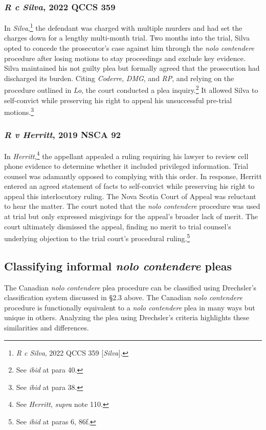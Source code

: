 \subsubsection{\textit{R c Silva}, 2022 QCCS 359}

In \textit{Silva},\footnote{\textit{R c Silva}, 2022 QCCS 359 [\textit{Silva}].} the defendant was charged with multiple murders and had set the charges down for a lengthy multi-month trial. Two months into the trial, Silva opted to concede the prosecutor's case against him through the \textit{nolo contendere} procedure after losing motions to stay proceedings and exclude key evidence. Silva maintained his not guilty plea but formally agreed that the prosecution had discharged its burden. Citing \textit{Coderre}, \textit{DMG}, and \textit{RP}, and relying on the procedure outlined in \textit{Lo}, the court conducted a plea inquiry.\footnote{See \textit{ibid} at para 40.} It allowed Silva to self-convict while preserving his right to appeal his unsuccessful pre-trial motions.\footnote{See \textit{ibid} at para 38.}

\subsubsection{\textit{R v Herritt}, 2019 NSCA 92}

In \textit{Herritt},\footnote{See \textit{Herritt}, \textit{supra} note 110.} the appellant appealed a ruling requiring his lawyer to review cell phone evidence to determine whether it included privileged information. Trial counsel was adamantly opposed to complying with this order. In response, Herritt entered an agreed statement of facts to self-convict while preserving his right to appeal this interlocutory ruling. The Nova Scotia Court of Appeal was reluctant to hear the matter. The court noted that the \textit{nolo contendere} procedure was used at trial but only expressed misgivings for the appeal's broader lack of merit. The court ultimately dismissed the appeal, finding no merit to trial counsel's underlying objection to the trial court's procedural ruling.\footnote{See \textit{ibid} at paras 6, 86f.}

\subsection{Classifying informal \textit{nolo contendere} pleas}

The Canadian \textit{nolo contendere} plea procedure can be classified using Drechsler's classification system discussed in §2.3 above. The Canadian \textit{nolo contendere} procedure is functionally equivalent to a \textit{nolo contendere} plea in many ways but unique in others. Analyzing the plea using Drechsler's criteria highlights these similarities and differences.

